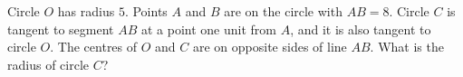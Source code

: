 Circle $O$ has radius $5$. Points $A$ and $B$ are on the circle with $AB=8$. Circle $C$ is tangent to segment $AB$ at a point one unit from $A$, and it is also tangent to circle $O$. The centres of $O$ and $C$ are on opposite sides of line $AB$. What is the radius of circle $C$?
